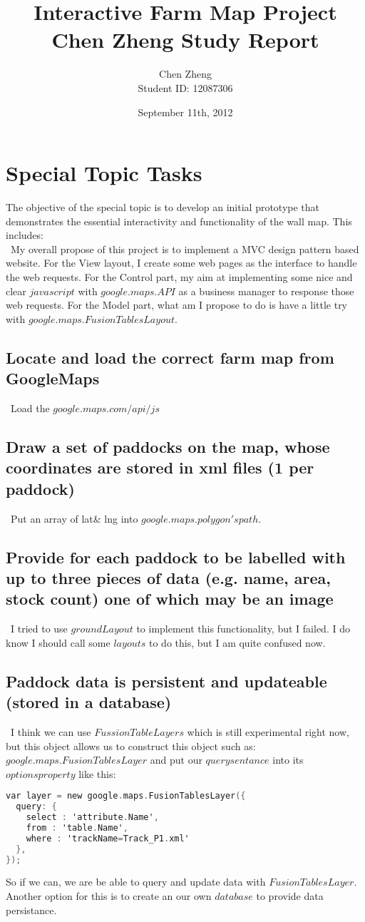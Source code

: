 \documentclass[titlepage,a4paper]{article}
\begin{document}
\title{\Huge{Interactive Farm Map Project}\\ \huge{Chen Zheng Study Report}}
\author{\Large{Chen Zheng} \\Student ID: 12087306}
\date{September 11th, 2012}
\maketitle
%
%
\section{Special Topic Tasks}
The objective of the special topic is to develop an initial prototype that demonstrates the essential interactivity and functionality of the wall map. This includes:\\
\textbullet \ My overall propose of this project is to implement a MVC design pattern based website. For the View layout, I create some web pages as the interface to handle the web requests. For the Control part, my aim at implementing some nice and clear $javascript$ with $google.maps.API$ as a business manager to response those web requests. For the Model part, what am I propose to do is have a little try with $google.maps.FusionTablesLayout$. 
\subsection{Locate and load the correct farm map from GoogleMaps}
\textbullet \  Load the $google.maps.com/api/js$
\subsection{Draw a set of paddocks on the map, whose coordinates are stored in xml files (1 per paddock)}
\textbullet \  Put an array of lat\& lng into $google.maps.polygon's path$.
\subsection{Provide for each paddock to be labelled with up to three pieces of data (e.g. name, area, stock count) one of which may be an image}
\textbullet \ I tried to use $groundLayout$ to implement this functionality, but I failed. I do know I should call some $layouts$ to do this, but I am quite confused now.
\subsection{Paddock data is persistent and updateable (stored in a database)}
\textbullet \ I think we can use $Fussion Table Layers$ which is still experimental right now, but this object allows us to construct this object such as: $google.maps.FusionTablesLayer$ and put our $query sentance$ into its $options property$ like this: 
\begin{lstlisting}[language=C]
var layer = new google.maps.FusionTablesLayer({
  query: {
    select : 'attribute.Name',
    from : 'table.Name',
    where : 'trackName=Track_P1.xml'
  },
});
\end{lstlisting}
So if we can, we are be able to query and update data with $FusionTablesLayer$.\\
Another option for this is to create an our own $database$ to provide data persistance.
\end{document}
